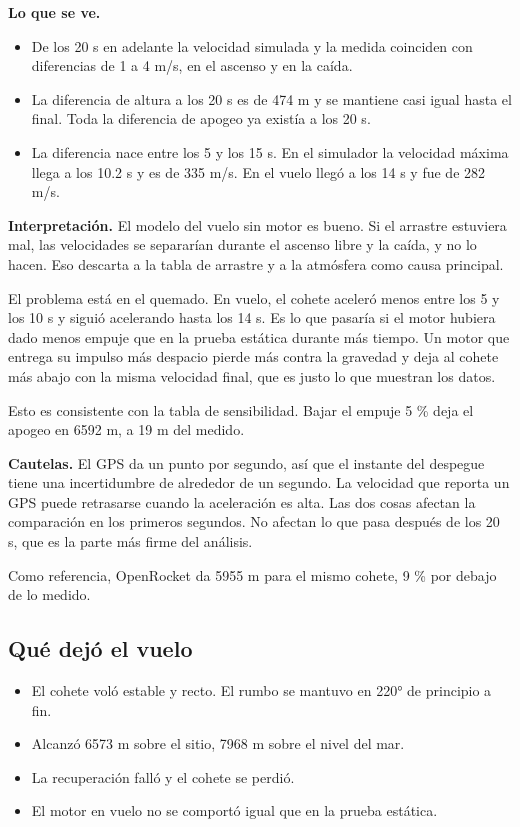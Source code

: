 \textbf{Lo que se ve.}

\begin{itemize}
\tightlist
\item
  De los 20 s en adelante la velocidad simulada y la medida
  coinciden con diferencias de 1 a 4 m/s, en el ascenso y en
  la caída.
\item
  La diferencia de altura a los 20 s es de 474 m y se
  mantiene casi igual hasta el final. Toda la diferencia de
  apogeo ya existía a los 20 s.
\item
  La diferencia nace entre los 5 y los 15 s. En el simulador
  la velocidad máxima llega a los 10.2 s y es de 335 m/s. En
  el vuelo llegó a los 14 s y fue de 282 m/s.
\end{itemize}

\textbf{Interpretación.} El modelo del vuelo sin motor es
bueno. Si el arrastre estuviera mal, las velocidades se
separarían durante el ascenso libre y la caída, y no lo
hacen. Eso descarta a la tabla de arrastre y a la atmósfera
como causa principal.

El problema está en el quemado. En vuelo, el cohete aceleró
menos entre los 5 y los 10 s y siguió acelerando hasta los
14 s. Es lo que pasaría si el motor hubiera dado menos
empuje que en la prueba estática durante más tiempo. Un
motor que entrega su impulso más despacio pierde más contra
la gravedad y deja al cohete más abajo con la misma
velocidad final, que es justo lo que muestran los datos.

Esto es consistente con la tabla de sensibilidad. Bajar el
empuje 5 \% deja el apogeo en 6592 m, a 19 m del medido.

\textbf{Cautelas.} El GPS da un punto por segundo, así que
el instante del despegue tiene una incertidumbre de
alrededor de un segundo. La velocidad que reporta un GPS
puede retrasarse cuando la aceleración es alta. Las dos
cosas afectan la comparación en los primeros segundos. No
afectan lo que pasa después de los 20 s, que es la parte más
firme del análisis.

Como referencia, OpenRocket da 5955 m para el mismo cohete,
9 \% por debajo de lo medido.

\subsection{Qué dejó el
vuelo}\label{quuxe9-dejuxf3-el-vuelo}

\begin{itemize}
\tightlist
\item
  El cohete voló estable y recto. El rumbo se mantuvo en
  220° de principio a fin.
\item
  Alcanzó 6573 m sobre el sitio, 7968 m sobre el nivel del
  mar.
\item
  La recuperación falló y el cohete se perdió.
\item
  El motor en vuelo no se comportó igual que en la prueba
  estática.
\end{itemize}

